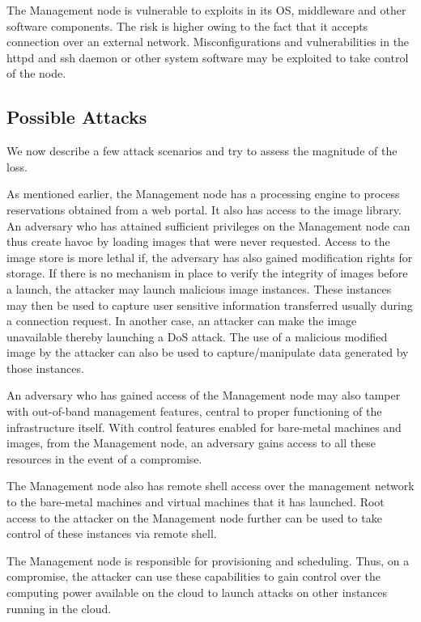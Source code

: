 \documentclass[10pt,twocolumn,pdftex]{article}
\begin{document}
The Management node is vulnerable to exploits in its OS, middleware and other software components. The risk is higher owing to the fact that it accepts connection over an external network. Misconfigurations and vulnerabilities in the httpd and ssh daemon or other system software may be exploited to take control of the node. 

\subsection{Possible Attacks}
We now describe a few attack scenarios and try to assess the magnitude of the loss.

As mentioned earlier, the Management node has a processing engine to process reservations obtained from a web portal. It also has access to the image library. An adversary who has attained sufficient privileges on the Management node can thus create havoc by loading images that were never requested. Access to the image store is more lethal if, the adversary has also gained modification rights for storage. If there is no mechanism in place to verify the integrity of images before a launch, the attacker may launch malicious image instances. These instances may then be used to capture user sensitive information transferred usually during a connection request. In another case, an attacker can make the image unavailable thereby launching a DoS attack. The use of a malicious modified image by the attacker can also be used to capture/manipulate data generated by those instances.

An adversary who has gained access of the Management node may also tamper with out-of-band management features, central to proper functioning of the infrastructure itself. With control features enabled for bare-metal machines and images, from the Management node, an adversary gains access to all these resources in the event of a compromise.

The Management node also has remote shell access over the management network to the bare-metal machines and virtual machines that it has launched. Root access to the attacker on the Management node further can be used to take control of these instances via remote shell.

The Management node is responsible for provisioning and scheduling. Thus, on a compromise, the attacker can use these capabilities to gain control over the computing power available on the cloud to launch attacks on other instances running in the cloud.
\end{document}
